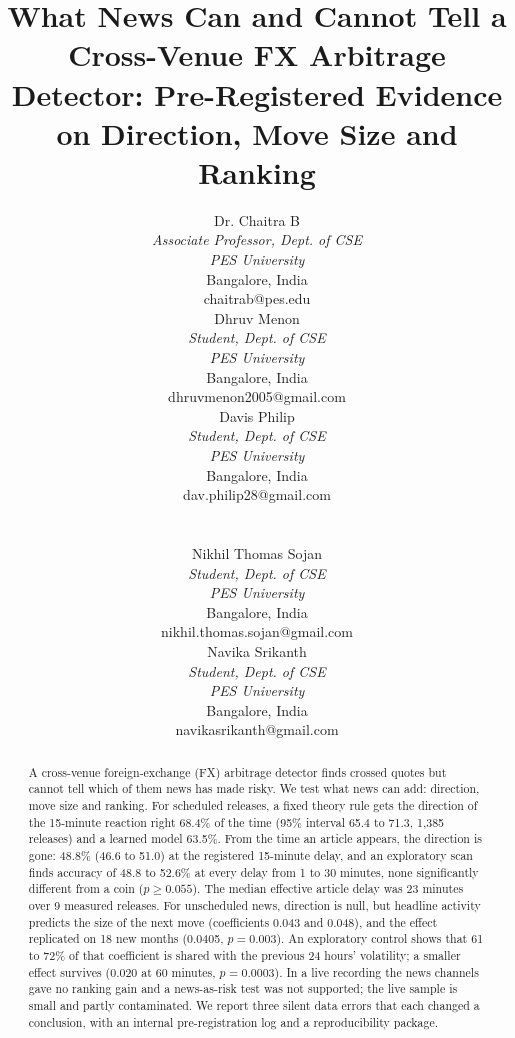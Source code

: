 \documentclass[conference]{IEEEtran}
\begin{document}
\title{What News Can and Cannot Tell a Cross-Venue FX Arbitrage Detector: Pre-Registered Evidence on Direction, Move Size and Ranking}

\newcommand{\authorbox}[3]{\begin{tabular}[t]{@{}c@{}}
#1\\ \textit{#2}\\ \textit{PES University}\\ Bangalore, India\\ #3
\end{tabular}}
\author{%
\authorbox{Dr. Chaitra B}{Associate Professor, Dept. of CSE}{chaitrab@pes.edu}%
\hspace{2.5em}%
\authorbox{Dhruv Menon}{Student, Dept. of CSE}{dhruvmenon2005@gmail.com}%
\hspace{2.5em}%
\authorbox{Davis Philip}{Student, Dept. of CSE}{dav.philip28@gmail.com}\\[2ex]
\authorbox{Nikhil Thomas Sojan}{Student, Dept. of CSE}{nikhil.thomas.sojan@gmail.com}%
\hspace{2.5em}%
\authorbox{Navika Srikanth}{Student, Dept. of CSE}{navikasrikanth@gmail.com}%
}

\maketitle

\begin{abstract}
A cross-venue foreign-exchange (FX) arbitrage detector finds crossed quotes but cannot tell which
of them news has made risky. We test what news can add: direction, move size and ranking. For
scheduled releases, a fixed theory rule gets the direction of the 15-minute reaction right 68.4\%
of the time (95\% interval 65.4 to 71.3, 1,385 releases) and a learned model 63.5\%. From the time
an article appears, the direction is gone: 48.8\% (46.6 to 51.0) at the registered 15-minute delay,
and an exploratory scan finds accuracy of 48.8 to 52.6\% at every delay from 1 to 30 minutes, none
significantly different from a coin ($p\ge0.055$). The
median effective article delay was 23 minutes over 9 measured releases. For unscheduled news,
direction is null, but headline activity predicts the size of the next move (coefficients 0.043 and
0.048), and the effect replicated on 18 new months (0.0405, $p=0.003$). An
exploratory control shows that 61 to 72\% of that coefficient is shared with the previous 24 hours'
volatility; a smaller effect survives (0.020 at 60 minutes, $p=0.0003$). In a live recording the
news channels gave no ranking gain and a news-as-risk test was not supported; the live sample is
small and partly contaminated. We report three silent data errors that each changed a conclusion,
with an internal pre-registration log and a reproducibility package.
\end{abstract}
\end{document}
